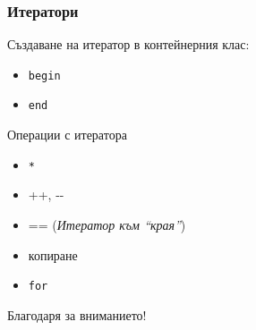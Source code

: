 \documentclass{beamer}
\begin{document}
\begin{frame}[fragile]
\frametitle{Итератори}

Създаване на итератор в контейнерния клас:
\begin{itemize}
  \item \texttt{begin}
  \item \texttt{end}
\end{itemize}
Операции с итератора
\begin{itemize}
  \item \texttt{*}
  \item ++, -{}-
  \item == (\emph{Итератор към ``края''})
  \item копиране
  \item \texttt{for}
\end{itemize}


\end{frame}


\begin{frame}
\centerline{Благодаря за вниманието!}
\end{frame}
\end{document}
